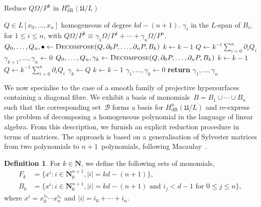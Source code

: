 \documentclass[a4paper,11pt]{article}
\numberwithin{equation}{section}
\providecommand{\abs}[1]{\lvert#1\rvert}                 %
\newcommand{\NN}{\mathbf{N}} %
\providecommand{\HdR}{H_{\text{dR}}}    %
\providecommand{\cB}{\mathcal{B}} %
\theoremstyle{definition}
\newtheorem{defn}[thm]{Definition}
\begin{document}
\begin{algorithm}
\caption{Reduce $Q \Omega / P^k$ in $\HdR^n(\mathfrak{U}/L)$}
\label{alg:PoleRed}
\begin{algorithmic}
\vspace{1mm}
\Require $Q \in L[x_0, \dotsc, x_n]$ homogeneous of degree $kd - (n+1)$.
\Ensure  $\gamma_i$ in the $L$-span of $B_i$, for $1 \leq i \leq n$, with  
         $Q \Omega / P^k \equiv \gamma_{1} \Omega / P^{1} + \dotsb + \gamma_n \Omega / P^n$.
\State $Q_0, \dotsc, Q_n, \bullet \gets \Call{Decompose}{Q, \partial_0 P, \dotsc, \partial_n P, B_k}$
\State $k \gets k-1$
\State $Q \gets k^{-1} \sum_{i=0}^n \partial_i Q_i$
\EndWhile
\State $\gamma_{k+1}, \dotsc, \gamma_{n} \gets 0$
\State $Q_0, \dotsc, Q_n, \gamma_k \gets \Call{Decompose}{Q, \partial_0 P, \dotsc, \partial_n P, B_k}$
\State $k \gets k-1$
\State $Q \gets k^{-1} \sum_{i=0}^n \partial_i Q_i$
\EndWhile
{}
\State $\gamma_{k} \gets Q$
\State $k \gets k-1$
\EndIf
\State $\gamma_{1}, \dotsc, \gamma_{k} \gets 0$
\State \textbf{return} $\gamma_{1}, \dotsc, \gamma_n$
\EndProcedure
\end{algorithmic}
\end{algorithm}

We now specialise to the case of a smooth family of projective 
hypersurfaces containing a diagonal fibre.  We exhibit a basis 
of monomials~$B = B_1 \cup \dotsb \cup B_n$ such that the 
corresponding set~$\cB$ forms a basis for $\HdR^n(\mathfrak{U}/L)$ 
and re-express the problem of decomposing a homogeneous polynomial 
in the language of linear algebra.  From this description, we furnish 
an explicit reduction procedure in terms of matrices.  The approach 
is based on a generalisation of Sylvester matrices from two 
polynomials to $n+1$~polynomials, following Macaulay~\citep{Macaulay1994}.

\begin{defn} \label{defn:MonBasis}
For $k \in \NN$, we define the following sets of monomials, 
\begin{align*}
F_k & = \{ x^i : i \in \mathbf{N}_{0}^{n+1}, \abs{i} = k d - (n+1) \}, \\
B_k & = \{ x^i : i \in \mathbf{N}_{0}^{n+1}, \abs{i} = k d - (n+1) \text{ and $i_j < d-1$ for $0 \leq j \leq n$}\},
\end{align*}
where $x^i = x_0^{i_0} \dotsm x_n^{i_n}$ and 
$\abs{i} = i_0 + \dotsb + i_n$.
\end{defn}
\end{document}
